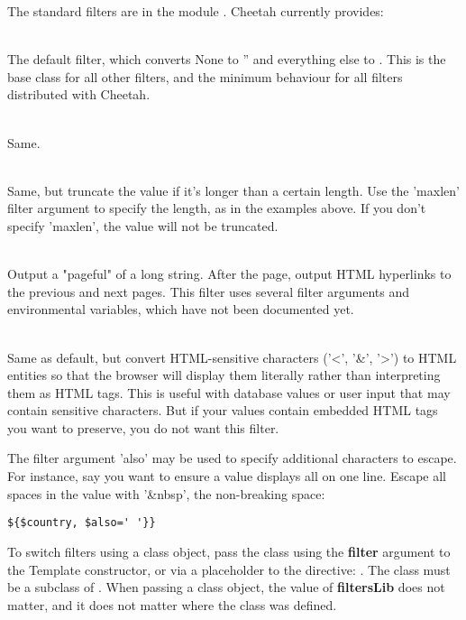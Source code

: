 The standard filters are in the module .  Cheetah
currently provides:

\begin{description}
\item{}
     \\ The default filter, which converts None to '' and everything else to
     .  This is the base class for all other filters,
     and the minimum behaviour for all filters distributed with Cheetah.
\item{}
     \\ Same.
\item{}
     \\ Same, but truncate the value if it's longer than a certain length.
     Use the 'maxlen' filter argument to specify the length, as in the
     examples above.  If you don't specify 'maxlen', the value will not be
     truncated.
\item{}
     \\ Output a "pageful" of a long string.  After the page, output HTML
     hyperlinks to the previous and next pages.  This filter uses several
     filter arguments and environmental variables, which have not been 
     documented yet.
\item{}
     \\ Same as default, but convert HTML-sensitive characters ('<', '\&', '>')
     to HTML entities so that the browser will display them literally rather
     than interpreting them as HTML tags.  This is useful with database values
     or user input that may contain sensitive characters.  But if your values
     contain embedded HTML tags you want to preserve, you do not want this 
     filter.
     
     The filter argument 'also' may be used to specify additional characters to
     escape.  For instance, say you want to ensure a value displays all on one
     line.  Escape all spaces in the value with '\&nbsp', the non-breaking
     space:
\begin{verbatim}
${$country, $also=' '}}
\end{verbatim}
\end{description}

To switch filters using a class object, pass the class using the
{\bf filter} argument to the Template constructor, or via a placeholder to the
 directive: .  The class must be
a subclass of .  When passing a class object, the
value of {\bf filtersLib} does not matter, and it does not matter where the
class was defined.

